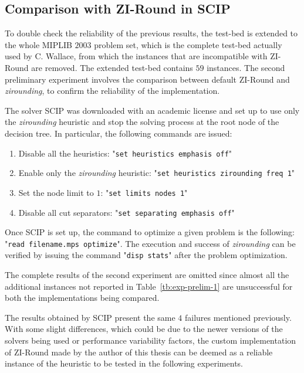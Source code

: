 \documentclass[a4paper,12pt]{book}
\begin{document}
\subsection{Comparison with ZI-Round in SCIP}
To double check the reliability of the previous results, the test-bed is extended to the whole MIPLIB $2003$ problem set, which is the complete test-bed actually used by C. Wallace, from which the instances that are incompatible with ZI-Round are removed. The extended test-bed contains $59$ instances. The second preliminary experiment involves the comparison between default ZI-Round and \textit{zirounding}, to confirm the reliability of the implementation. \par 

The solver SCIP was downloaded with an academic license and set up to use only the \textit{zirounding} heuristic and stop the solving process at the root node of the decision tree. In particular, the following commands are issued:
\begin{enumerate}
	\item Disable all the heuristics: "\texttt{set heuristics emphasis off}"
	\item Enable only the \textit{zirounding} heuristic: "\texttt{set heuristics zirounding freq 1}"
	\item Set the node limit to $1$: "\texttt{set limits nodes 1}"
	\item Disable all cut separators: "\texttt{set separating emphasis off}"
\end{enumerate}
Once SCIP is set up, the command to optimize a given problem is the following: "\texttt{read filename.mps optimize}". The execution and success of \textit{zirounding} can be verified by issuing the command "\texttt{disp stats}" after the problem optimization. \par

The complete results of the second experiment are omitted since almost all the additional instances not reported in Table~\ref{tb:exp-prelim-1} are unsuccessful for both the implementations being compared.  \par 

The results obtained by SCIP present the same $4$ failures mentioned previously. With some slight differences, which could be due to the newer versions of the solvers being used or performance variability factors, the custom implementation of ZI-Round made by the author of this thesis can be deemed as a reliable instance of the heuristic to be tested in the following experiments.
\end{document}
